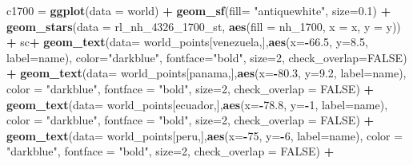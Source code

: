 \documentclass[12pt,oneside]{reedthesis}
\newenvironment{Shaded}{\begin{snugshade}}{\end{snugshade}}
\newcommand{\DataTypeTok}[1]{\textcolor[rgb]{0.13,0.29,0.53}{#1}}
\newcommand{\DecValTok}[1]{\textcolor[rgb]{0.00,0.00,0.81}{#1}}
\newcommand{\FloatTok}[1]{\textcolor[rgb]{0.00,0.00,0.81}{#1}}
\newcommand{\KeywordTok}[1]{\textcolor[rgb]{0.13,0.29,0.53}{\textbf{#1}}}
\newcommand{\NormalTok}[1]{#1}
\newcommand{\OperatorTok}[1]{\textcolor[rgb]{0.81,0.36,0.00}{\textbf{#1}}}
\newcommand{\OtherTok}[1]{\textcolor[rgb]{0.56,0.35,0.01}{#1}}
\newcommand{\StringTok}[1]{\textcolor[rgb]{0.31,0.60,0.02}{#1}}
\begin{document}
\begin{Shaded}
\begin{Highlighting}[]
\NormalTok{c1700 =}\StringTok{ }\KeywordTok{ggplot}\NormalTok{(}\DataTypeTok{data =}\NormalTok{ world) }\OperatorTok{+}\StringTok{ }
\StringTok{  }\KeywordTok{geom_sf}\NormalTok{(}\DataTypeTok{fill=} \StringTok{"antiquewhite"}\NormalTok{, }\DataTypeTok{size=}\FloatTok{0.1}\NormalTok{) }\OperatorTok{+}\StringTok{ }
\StringTok{  }\KeywordTok{geom_stars}\NormalTok{(}\DataTypeTok{data =}\NormalTok{ rl_nh_}\DecValTok{4326}\NormalTok{_}\DecValTok{1700}\NormalTok{_st, }\KeywordTok{aes}\NormalTok{(}\DataTypeTok{fill =}\NormalTok{ nh_}\DecValTok{1700}\NormalTok{, }\DataTypeTok{x =}\NormalTok{ x, }\DataTypeTok{y =}\NormalTok{ y)) }\OperatorTok{+}\StringTok{ }
\StringTok{  }\NormalTok{sc}\OperatorTok{+}
\StringTok{  }\KeywordTok{geom_text}\NormalTok{(}\DataTypeTok{data=}\NormalTok{ world_points[venezuela,],}\KeywordTok{aes}\NormalTok{(}\DataTypeTok{x=}\OperatorTok{-}\FloatTok{66.5}\NormalTok{, }\DataTypeTok{y=}\FloatTok{8.5}\NormalTok{, }\DataTypeTok{label=}\NormalTok{name), }\DataTypeTok{color=}\StringTok{"darkblue"}\NormalTok{, }\DataTypeTok{fontface=}\StringTok{"bold"}\NormalTok{, }\DataTypeTok{size=}\DecValTok{2}\NormalTok{, }\DataTypeTok{check_overlap=}\OtherTok{FALSE}\NormalTok{) }\OperatorTok{+}
\StringTok{  }\KeywordTok{geom_text}\NormalTok{(}\DataTypeTok{data=}\NormalTok{ world_points[panama,],}\KeywordTok{aes}\NormalTok{(}\DataTypeTok{x=}\OperatorTok{-}\FloatTok{80.3}\NormalTok{, }\DataTypeTok{y=}\FloatTok{9.2}\NormalTok{, }\DataTypeTok{label=}\NormalTok{name), }\DataTypeTok{color =} \StringTok{"darkblue"}\NormalTok{, }\DataTypeTok{fontface =} \StringTok{"bold"}\NormalTok{, }\DataTypeTok{size=}\DecValTok{2}\NormalTok{, }\DataTypeTok{check_overlap =} \OtherTok{FALSE}\NormalTok{) }\OperatorTok{+}\StringTok{ }
\StringTok{  }\KeywordTok{geom_text}\NormalTok{(}\DataTypeTok{data=}\NormalTok{ world_points[ecuador,],}\KeywordTok{aes}\NormalTok{(}\DataTypeTok{x=}\OperatorTok{-}\FloatTok{78.8}\NormalTok{, }\DataTypeTok{y=}\OperatorTok{-}\DecValTok{1}\NormalTok{, }\DataTypeTok{label=}\NormalTok{name), }\DataTypeTok{color =} \StringTok{"darkblue"}\NormalTok{, }\DataTypeTok{fontface =} \StringTok{"bold"}\NormalTok{, }\DataTypeTok{size=}\DecValTok{2}\NormalTok{, }\DataTypeTok{check_overlap =} \OtherTok{FALSE}\NormalTok{) }\OperatorTok{+}
\StringTok{  }\KeywordTok{geom_text}\NormalTok{(}\DataTypeTok{data=}\NormalTok{ world_points[peru,],}\KeywordTok{aes}\NormalTok{(}\DataTypeTok{x=}\OperatorTok{-}\DecValTok{75}\NormalTok{, }\DataTypeTok{y=}\OperatorTok{-}\DecValTok{6}\NormalTok{, }\DataTypeTok{label=}\NormalTok{name), }\DataTypeTok{color =} \StringTok{"darkblue"}\NormalTok{, }\DataTypeTok{fontface =} \StringTok{"bold"}\NormalTok{, }\DataTypeTok{size=}\DecValTok{2}\NormalTok{, }\DataTypeTok{check_overlap =} \OtherTok{FALSE}\NormalTok{) }\OperatorTok{+}

\end{Highlighting}
\end{Shaded}
\end{document}
